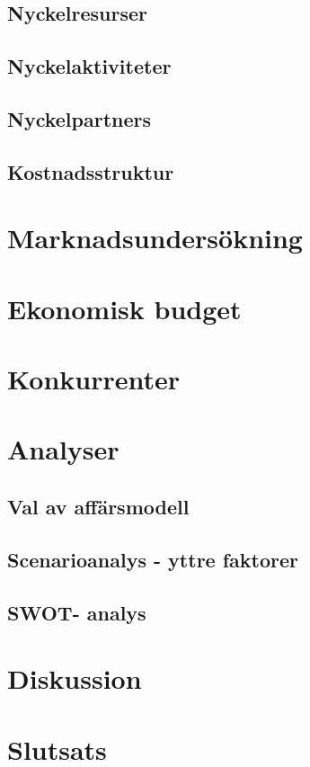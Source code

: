 \documentclass[10pt,a4paper,oneside]{article}
\begin{document}
\subsection{Nyckelresurser}
\subsection{Nyckelaktiviteter}
\subsection{Nyckelpartners}
\subsection{Kostnadsstruktur}
\newpage

\section{Marknadsundersökning}
\newpage

\section{Ekonomisk budget}
\newpage

\section{Konkurrenter}
\newpage

\section{Analyser}
\subsection{Val av affärsmodell}
\subsection{Scenarioanalys  - yttre faktorer}
\subsection{SWOT- analys}
\newpage

\section{Diskussion}
\newpage

\section{Slutsats}
\newpage
\end{document}
